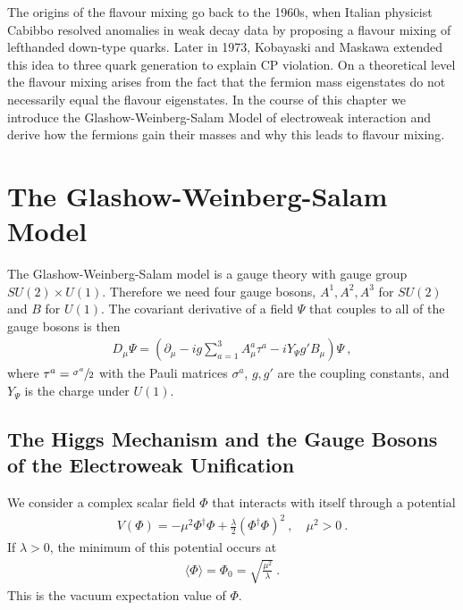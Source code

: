 \cite[Chapter 20]{Peskin}
\cite[Chapter 1.2.1]{Tevatron}
The origins of the flavour mixing go back to the 1960s, when Italian physicist Cabibbo resolved anomalies in weak decay data by proposing a flavour mixing of lefthanded down-type quarks. Later in 1973, Kobayaski and Maskawa extended this idea to three quark generation to explain CP violation. On a theoretical level the flavour mixing arises from the fact that the fermion mass eigenstates do not necessarily equal the flavour eigenstates. In the course of this chapter we introduce the Glashow-Weinberg-Salam Model of electroweak interaction and derive how the fermions gain their masses and why this leads to flavour mixing.

\section{The Glashow-Weinberg-Salam Model}
The Glashow-Weinberg-Salam model is a gauge theory with gauge group $SU(2)\times U(1)$. Therefore we need four gauge bosons, $A^1,A^2,A^3$ for $SU(2)$ and $B$ for $U(1)$. The covariant derivative of a field $\Psi$ that couples to all of the gauge bosons is then
\begin{align}
	D_\mu\Psi = \left(\partial_\mu-ig\sum_{a=1}^{3}A_\mu^a\tau^a-iY_\Psi g'B_\mu\right)\Psi \ ,
\end{align}
where $\tau^a =\sfrac{\sigma^a}{2}$ with the Pauli matrices $\sigma^a$, $g,g'$ are the coupling constants, and $Y_\Psi$ is the charge under $U(1)$.
\subsection{The Higgs Mechanism and the Gauge Bosons of the Electroweak Unification}
We consider a complex scalar field $\Phi$ that interacts with itself through a potential
\begin{align}
	V(\Phi) = -\mu^2\Phi^\dagger\Phi + \frac{\lambda}{2}(\Phi^\dagger\Phi)^2 \ , \quad \mu^2 > 0 \ .
\end{align}
If $\lambda>0$, the minimum of this potential occurs at
\begin{align}
	\langle\Phi\rangle = \Phi_0 =  \sqrt{\frac{\mu^2}{\lambda}} \ .
\end{align}
This is the vacuum expectation value of $\Phi$.

